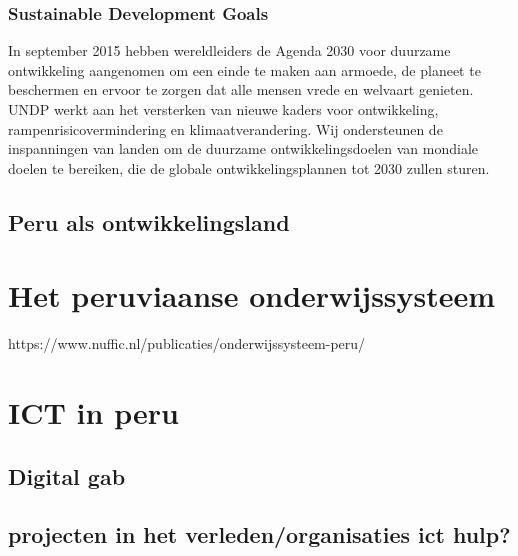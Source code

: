 \subsubsection{Sustainable Development Goals}
In september 2015 hebben wereldleiders de Agenda 2030 voor duurzame ontwikkeling aangenomen om een einde te maken aan armoede, de planeet te beschermen en ervoor te zorgen dat alle mensen vrede en welvaart genieten. UNDP werkt aan het versterken van nieuwe kaders voor ontwikkeling, rampenrisicovermindering en klimaatverandering. Wij ondersteunen de inspanningen van landen om de duurzame ontwikkelingsdoelen van mondiale doelen te bereiken, die de globale ontwikkelingsplannen tot 2030 zullen sturen.
 \autocite{DevelopmentProgram2020}
 
 \subsection{Peru als ontwikkelingsland}
 
 
\section{Het peruviaanse onderwijssysteem}
https://www.nuffic.nl/publicaties/onderwijssysteem-peru/

\section{ICT in peru}
\subsection{Digital gab}
\subsection{projecten in het verleden/organisaties ict hulp?}

